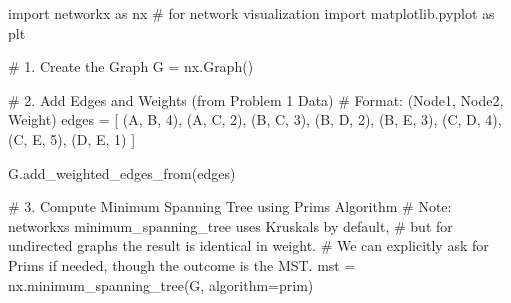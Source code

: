 \documentclass[
  letterpaper,
  DIV=11,
  numbers=noendperiod]{scrreprt}
\newenvironment{Shaded}{\begin{snugshade}}{\end{snugshade}}
\newcommand{\CommentTok}[1]{\textcolor[rgb]{0.37,0.37,0.37}{#1}}
\newcommand{\DecValTok}[1]{\textcolor[rgb]{0.68,0.00,0.00}{#1}}
\newcommand{\ImportTok}[1]{\textcolor[rgb]{0.00,0.46,0.62}{#1}}
\newcommand{\NormalTok}[1]{\textcolor[rgb]{0.00,0.23,0.31}{#1}}
\newcommand{\OperatorTok}[1]{\textcolor[rgb]{0.37,0.37,0.37}{#1}}
\newcommand{\StringTok}[1]{\textcolor[rgb]{0.13,0.47,0.30}{#1}}
\begin{document}
\begin{Shaded}
\begin{Highlighting}[]
\ImportTok{import}\NormalTok{ networkx }\ImportTok{as}\NormalTok{ nx }\CommentTok{\# for network visualization}
\ImportTok{import}\NormalTok{ matplotlib.pyplot }\ImportTok{as}\NormalTok{ plt}

\CommentTok{\# 1. Create the Graph}
\NormalTok{G }\OperatorTok{=}\NormalTok{ nx.Graph()}

\CommentTok{\# 2. Add Edges and Weights (from Problem 1 Data)}
\CommentTok{\# Format: (Node1, Node2, Weight)}
\NormalTok{edges }\OperatorTok{=}\NormalTok{ [}
\NormalTok{    (}\StringTok{\textquotesingle{}A\textquotesingle{}}\NormalTok{, }\StringTok{\textquotesingle{}B\textquotesingle{}}\NormalTok{, }\DecValTok{4}\NormalTok{),}
\NormalTok{    (}\StringTok{\textquotesingle{}A\textquotesingle{}}\NormalTok{, }\StringTok{\textquotesingle{}C\textquotesingle{}}\NormalTok{, }\DecValTok{2}\NormalTok{),}
\NormalTok{    (}\StringTok{\textquotesingle{}B\textquotesingle{}}\NormalTok{, }\StringTok{\textquotesingle{}C\textquotesingle{}}\NormalTok{, }\DecValTok{3}\NormalTok{),}
\NormalTok{    (}\StringTok{\textquotesingle{}B\textquotesingle{}}\NormalTok{, }\StringTok{\textquotesingle{}D\textquotesingle{}}\NormalTok{, }\DecValTok{2}\NormalTok{),}
\NormalTok{    (}\StringTok{\textquotesingle{}B\textquotesingle{}}\NormalTok{, }\StringTok{\textquotesingle{}E\textquotesingle{}}\NormalTok{, }\DecValTok{3}\NormalTok{),}
\NormalTok{    (}\StringTok{\textquotesingle{}C\textquotesingle{}}\NormalTok{, }\StringTok{\textquotesingle{}D\textquotesingle{}}\NormalTok{, }\DecValTok{4}\NormalTok{),}
\NormalTok{    (}\StringTok{\textquotesingle{}C\textquotesingle{}}\NormalTok{, }\StringTok{\textquotesingle{}E\textquotesingle{}}\NormalTok{, }\DecValTok{5}\NormalTok{),}
\NormalTok{    (}\StringTok{\textquotesingle{}D\textquotesingle{}}\NormalTok{, }\StringTok{\textquotesingle{}E\textquotesingle{}}\NormalTok{, }\DecValTok{1}\NormalTok{)}
\NormalTok{]}

\NormalTok{G.add\_weighted\_edges\_from(edges)}

\CommentTok{\# 3. Compute Minimum Spanning Tree using Prim\textquotesingle{}s Algorithm}
\CommentTok{\# Note: networkx\textquotesingle{}s minimum\_spanning\_tree uses Kruskal\textquotesingle{}s by default, }
\CommentTok{\# but for undirected graphs the result is identical in weight.}
\CommentTok{\# We can explicitly ask for Prim\textquotesingle{}s if needed, though the outcome is the MST.}
\NormalTok{mst }\OperatorTok{=}\NormalTok{ nx.minimum\_spanning\_tree(G, algorithm}\OperatorTok{=}\StringTok{\textquotesingle{}prim\textquotesingle{}}\NormalTok{)}


\end{Highlighting}
\end{Shaded}
\end{document}
